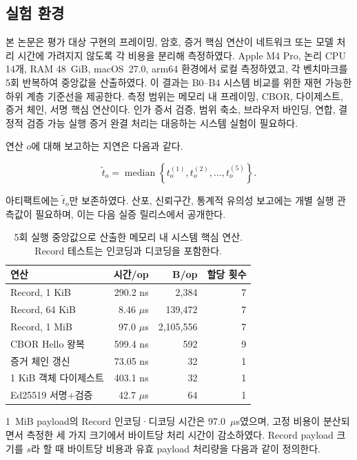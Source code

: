 \documentclass[10pt]{article}
\begin{document}
\subsection{실험 환경}

본 논문은 평가 대상 구현의 프레이밍, 암호, 증거 핵심 연산이 네트워크 또는 모델 처리 시간에 가려지지 않도록 각 비용을 분리해 측정하였다. Apple M4 Pro, 논리 CPU 14개, RAM 48~GiB, macOS~27.0, arm64 환경에서 로컬 측정하였고, 각 벤치마크를 5회 반복하여 중앙값을 산출하였다. 이 결과는 B0--B4 시스템 비교를 위한 재현 가능한 하위 계층 기준선을 제공한다. 측정 범위는 메모리 내 프레이밍, CBOR, 다이제스트, 증거 체인, 서명 핵심 연산이다. 인가 증서 검증, 범위 축소, 브라우저 바인딩, 연합, 결정적 검증 가능 실행 증거 완결 처리는 대응하는 시스템 실험이 필요하다.

연산 $o$에 대해 보고하는 지연은 다음과 같다.

\begin{equation}
\widetilde{t}_o = \operatorname{median}
  \left\{t_o^{(1)},t_o^{(2)},\ldots,t_o^{(5)}\right\}.
\label{eq:median}
\end{equation}

아티팩트에는 $\widetilde{t}_o$만 보존하였다. 산포, 신뢰구간, 통계적 유의성 보고에는 개별 실행 관측값이 필요하며, 이는 다음 실증 릴리스에서 공개한다.

\begin{table}[t]
\centering
\caption{5회 실행 중앙값으로 산출한 메모리 내 시스템 핵심 연산. Record 테스트는 인코딩과 디코딩을 포함한다.}
\label{tab:microbench}
\small
\begin{tabular}{@{}l r r r@{}}
\toprule
연산 & 시간/op & B/op & 할당 횟수 \\
\midrule
Record, 1 KiB & 290.2 ns & 2,384 & 7 \\
Record, 64 KiB & 8.46 $\mu$s & 139,472 & 7 \\
Record, 1 MiB & 97.0 $\mu$s & 2,105,556 & 7 \\
CBOR Hello 왕복 & 599.4 ns & 592 & 9 \\
증거 체인 갱신 & 73.05 ns & 32 & 1 \\
1 KiB 객체 다이제스트 & 403.1 ns & 32 & 1 \\
Ed25519 서명+검증 & 42.7 $\mu$s & 64 & 1 \\
\bottomrule
\end{tabular}
\end{table}

1~MiB payload의 Record 인코딩·디코딩 시간은 97.0~$\mu$s였으며, 고정 비용이 분산되면서 측정한 세 가지 크기에서 바이트당 처리 시간이 감소하였다. Record payload 크기를 $s$라 할 때 바이트당 비용과 유효 payload 처리량을 다음과 같이 정의한다.
\end{document}
